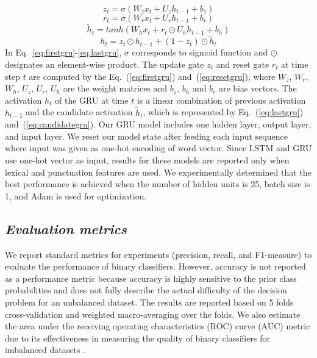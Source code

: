 \documentclass{amia}
\begin{document}
\begin{equation}
z_t = \sigma(W_zx_t + U_zh_{t-1} + b_z)
\label{eq:firstgru}
\end{equation}
\begin{equation}
r_t = \sigma(W_rx_t + U_rh_{t-1} + b_r)
\label{eq:resetgru}
\end{equation}
\begin{equation}
\tilde h_t = tanh(W_hx_t + r_t \odot U_hh_{t-1} + b_h) 
\label{eq:candidategru}
\end{equation}
\begin{equation}
h_t = z_t \odot h_{t-1} + (1-z_t) \odot \tilde h_t
\label{eq:lastgru}
\end{equation}  
In Eq.~\ref{eq:firstgru}-\ref{eq:lastgru}, $\sigma$ corresponds to sigmoid function and $\odot$ designates an element-wise product. The update gate $z_t$ and reset gate $r_t$ at time step $t$ are computed by the Eq.~(\ref{eq:firstgru}) and~(\ref{eq:resetgru}), where $W_z$, $W_r$, $W_h$, $U_z$, $U_r$, $U_h$ are the weight matrices and $b_z$, $b_h$ and $b_r$ are bias vectors. The activation $h_t$ of the GRU at time $t$ is a linear combination of previous activation $h_{t-1}$ and the candidate activation $\tilde h_t$, which is represented by Eq.~(\ref{eq:lastgru}) and~(\ref{eq:candidategru}). Our GRU model includes one hidden layer, output layer, and input layer. We reset our model state after feeding each input sequence where input was given as one-hot encoding of word vector. Since LSTM and GRU use one-hot vector as input, results for these models are reported only when lexical and punctuation features are used. We experimentally determined that the best performance is achieved when the number of hidden units is 25, batch size is 1, and Adam\cite{kingma2014adam} is used for optimization.         
  
\subsection*{\textit{Evaluation metrics}}
We report standard metrics for experiments (precision, recall, and F1-measure) to evaluate the performance of binary classifiers\cite{aas1999text}. However, accuracy is not reported as a performance metric because accuracy is highly sensitive to the prior class probabilities and does not fully describe the actual difficulty of the decision problem for an unbalanced dataset. The results are reported based on 5 folds cross-validation and weighted macro-averaging over the folds. We also estimate the area under the receiving operating characteristics (ROC) curve\cite{kumar2011receiver} (AUC) metric due to its effectiveness in measuring the quality of binary classifiers for imbalanced datasets \cite{hu2015kernelized}. 
\end{document}
